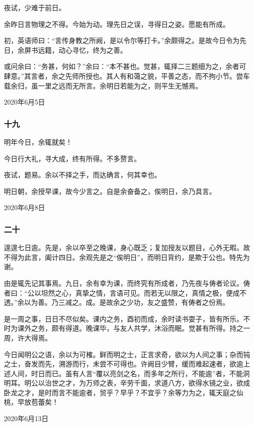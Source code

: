\documentclass[a5paper]{ctexart}
\begin{document}
	夜试，少难于前日。
	
	余昨日言物理之不得。今始为动。理先日之误，寻得日之姿。愿能有所成。
	
	初，英语师曰：“言传身教之所阙，是以令尔等打卡。”余颇得之。是故今日令为先日，余屏书远籍，动心寻忆，终为之善。
	
	或问余曰：“务甚，何如？”余曰：“本不甚也。觉甚，辄择二三题细为之，余者可肆意。”其言者，余之先师所授也。其人有和蔼之貌，平善之态，而不拘小节。尝车载余归，虽一里之远而无所言。余明日若能为之，则平生无憾焉。
	\begin{flushright}
		2020年6月5日
	\end{flushright}
	
	\subsubsection{十九}
	明年今日，余辄就矣！
	
	今日行大礼，寻大成，终有所得。不多赘言。
	
	夜试，题易。余以不择之手，而达确言，何其幸也。
	
	明日朝，余授早课，故今少言之。自是余奋备之，俟明日，余乃具言。
	\begin{flushright}
		2020年6月8日
	\end{flushright}
	
	\subsubsection{二十}
	遑遑七日逾。先是，余以卒至之晚课，身心既乏；复加授友以题目，心外无暇。故不得为此言，阖计四日。余观先是之“俟明日”，而明日背约，是欺于公也。特先为谢。
	
	由是辄先记其事焉。九日，余有幸为课，而终究有所成者，乃先夜与俦者论议。俦者曰：“公以坦然之心，真挚之情，言语可见。而若无以限之，真情之极，便成不透。”余以为善。乃三减之。成。是故余之少功，友之盛赞，有俦者之份焉。
	
	是一周之事，日日不尽似矣。课内之务，酉初而成，余时读书耍子，皆有所乐。不时为课外之务，颇有得道。晚课毕，与友人共学，沐浴而眠。觉甚有所得。持之一周，许大得焉。
	
	今日闻明公之语，余以为可榷。鲜而明之士，正言求奇，欲以为人间之事；杂而钝之士，奋发而先，溯游而行，未尝不可得也。许阙目少臂，缓而难起速者，欲逾上述人间，时日而已。虽有人言“覆以亮剑之名，而多年之所行，不能逾”者，不能洞明耳。明公以治世之才，为万师之表，辛劳千面，求道八方，欲得水镜之业，欲成卧龙之才，是时而言不能逾者，贸乎？早乎？不宜乎？余等力为之，辄天庭之仙桃，早放苞蕾矣！
	\begin{flushright}
		2020年6月13日
	\end{flushright}
	
\end{document}

